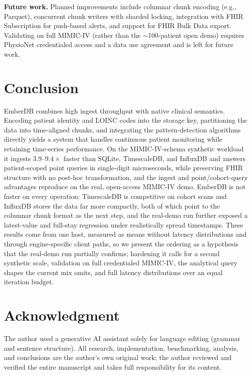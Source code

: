 \documentclass[journal]{IEEEtran}
\begin{document}
\textbf{Future work.}
Planned improvements include columnar chunk encoding (e.g., Parquet), concurrent chunk writers with sharded locking, integration with FHIR Subscription for push-based alerts, and support for FHIR Bulk Data export. Validating on full MIMIC-IV (rather than the $\sim$100-patient open demo) requires PhysioNet credentialed access and a data use agreement and is left for future work.

\section{Conclusion}
\label{sec:conclusion}

EmberDB combines high ingest throughput with native clinical semantics. Encoding patient identity and LOINC codes into the storage key, partitioning the data into time-aligned chunks, and integrating the pattern-detection algorithms directly yields a system that handles continuous patient monitoring while retaining time-series performance.
On the MIMIC-IV-schema synthetic workload it ingests $3.9$--$9.4\times$ faster than SQLite, TimescaleDB, and InfluxDB and answers patient-scoped point queries in single-digit microseconds, while preserving FHIR structure with no post-hoc transformation, and the ingest and point/cohort-query advantages reproduce on the real, open-access MIMIC-IV demo. EmberDB is not faster on every operation: TimescaleDB is competitive on cohort scans and InfluxDB stores the data far more compactly, both of which point to the columnar chunk format as the next step, and the real-demo run further exposed a latest-value and full-stay regression under realistically spread timestamps. These results come from one host, measured as means without latency distributions and through engine-specific client paths, so we present the ordering as a hypothesis that the real-demo run partially confirms; hardening it calls for a second synthetic scale, validation on full credentialed MIMIC-IV, the analytical query shapes the current mix omits, and full latency distributions over an equal iteration budget.

\section*{Acknowledgment}
The author used a generative AI assistant solely for language editing (grammar and sentence structure). All research, implementation, benchmarking, analysis, and conclusions are the author's own original work; the author reviewed and verified the entire manuscript and takes full responsibility for its content.
\end{document}
